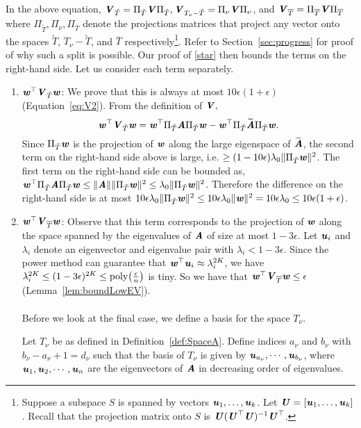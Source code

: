 In the above equation, $\VV_{\tilde{T}}= \Pi_{\tilde{T}}\VV\Pi_{\tilde{T}},\VV_{T_{\nu} -\tilde{T}}=\Pi_{\nu}\VV\Pi_{\nu}$, and $\VV_{\overline{T}} = \Pi_{\overline{T}}\VV\Pi_{\overline{T}}$ where $\Pi_{\tilde{T}},\Pi_{\nu},\Pi_{\overline{T}}$ denote the projections matrices that project any vector onto the spaces $\tilde{T}$, $T_{\nu}-\tilde{T}$, and $\overline{T}$ respectively\footnote{Suppose a subspace $S$ is spanned by vectors $\uu_1,\dots,\uu_k$. Let $\UU = [\uu_1,\dots,\uu_k]$. Recall that the projection matrix onto $S$ is $\UU(\UU^\top \UU)^{-1} \UU^\top$.}. Refer to Section~\ref{sec:progress} for proof of why such a split is possible. Our proof of \eqref{star} then bounds the terms on the right-hand side. Let us consider each term separately.
\begin{enumerate}
	\item $\ww^{\top}\VV_{\tilde{T}}\ww$: We prove that this is always at most $10\epsilon(1+\epsilon)$ (Equation~\eqref{eq:V2}). From the definition of $\VV,$ 
	\[
	\ww^{\top}\VV_{\tilde{T}}\ww = \ww^{\top}\Pi_{\tilde{T}}\AA\Pi_{\tilde{T}}\ww - \ww^{\top}\Pi_{\tilde{T}}\AAtil\Pi_{\tilde{T}}\ww.
	\] 
	Since $\Pi_{\tilde{T}}\ww$ is the projection of $\ww$ along the large eigenspace of $\AAtil$, the second term on the right-hand side above is large, i.e. $\geq (1- 10\epsilon)\lambda_0\|\Pi_{\tilde{T}}\ww\|^2$. The first term on the right-hand side can be bounded as, $\ww^{\top}\Pi_{\tilde{T}}\AA\Pi_{\tilde{T}}\ww \leq \|\AA\|\|\Pi_{\tilde{T}}\ww\|^2 \leq \lambda_0 \|\Pi_{\tilde{T}}\ww\|^2$.
 Therefore the difference on the right-hand side is at most $10\epsilon\lambda_0\|\Pi_{\tilde{T}}\ww\|^2 \leq 10 \epsilon\lambda_0\|\ww\|^2 = 10\epsilon \lambda_0 \leq 10\epsilon(1+\epsilon)$.
	\item $\ww^{\top}\VV_{\overline{T}}\ww$: Observe that this term corresponds to the projection of $\ww$ along the space spanned by the eigenvalues of $\AA$ of size at most $1-3\epsilon$. Let $\uu_i$ and $\lambda_i$ denote an eigenvector and eigenvalue pair with $\lambda_i<1-3\epsilon$. Since the power method can guarantee that $\ww^{\top}{\uu_i}\approx\lambda_i^{2K}$, we have  $\lambda_i^{2K} \leq (1-3\epsilon)^{2K}\leq \poly\left(\frac{\epsilon}{n}\right)$ is tiny. So we have that $\ww^{\top}\VV_{\overline{T}}\ww\leq \epsilon$ (Lemma~\ref{lem:boundLowEV}).

	\paragraph{}Before we look at the final case, we define a basis for the space $T_{\nu}$.
	\begin{definition}\label{def:Basis} Let $T_{\nu}$ be as defined in Definition~\ref{def:SpaceA}.  Define indices $a_{\nu}$ and $b_{\nu}$ with $b_{\nu}-a_{\nu}+1 = d_{\nu}$ such that the basis of $T_{\nu}$ is given by $\uu_{a_{\nu}},\cdots, \uu_{b_{\nu}}$, where $\uu_1,\uu_2,\cdots,\uu_n$ are the eigenvectors of $\AA$ in decreasing order of eigenvalues.
	\end{definition}


\end{enumerate}

